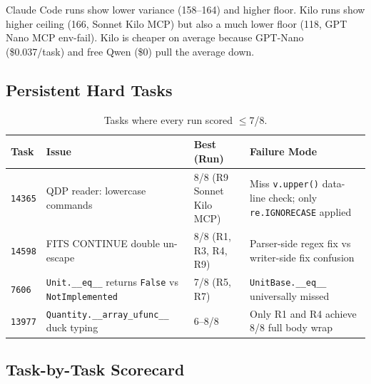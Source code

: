 \noindent
Claude Code runs show lower variance (158--164) and higher floor.
Kilo runs show higher ceiling (166, Sonnet Kilo MCP) but also a much lower floor
(118, GPT Nano MCP env-fail).
Kilo is cheaper on average because GPT-Nano (\$0.037/task) and free Qwen (\$0)
pull the average down.

\subsection{Persistent Hard Tasks}

\begin{table}[h]
\centering
\small
\caption{Tasks where every run scored $\le$7/8.}\label{tab:hardtasks}
\setlength{\tabcolsep}{4pt}
\begin{tabular}{llll}
\toprule
\textbf{Task} & \textbf{Issue} & \textbf{Best (Run)} & \textbf{Failure Mode} \\
\midrule
\texttt{14365} & QDP reader: lowercase commands & 8/8 (R9 Sonnet Kilo MCP) & Miss \texttt{v.upper()} data-line check; only \texttt{re.IGNORECASE} applied \\[3pt]
\texttt{14598} & FITS CONTINUE double un-escape & 8/8 (R1, R3, R4, R9) & Parser-side regex fix vs writer-side fix confusion \\[3pt]
\texttt{7606}  & \texttt{Unit.\_\_eq\_\_} returns \texttt{False} vs \texttt{NotImplemented} & 7/8 (R5, R7) & \texttt{UnitBase.\_\_eq\_\_} universally missed \\[3pt]
\texttt{13977} & \texttt{Quantity.\_\_array\_ufunc\_\_} duck typing & 6--8/8 & Only R1 and R4 achieve 8/8 full body wrap \\
\bottomrule
\end{tabular}
\end{table}

\subsection{Task-by-Task Scorecard}

